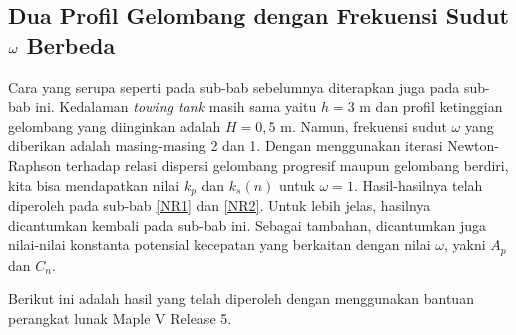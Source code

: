 \documentclass[12pt,a4paper]{report}
\begin{document}
\subsection{Dua Profil Gelombang dengan Frekuensi Sudut \textbf{$\protect \omega$} Berbeda}

Cara yang serupa seperti pada sub-bab sebelumnya diterapkan juga pada
sub-bab ini. Kedalaman \textit{towing tank} masih sama yaitu $h = 3$ m dan
profil ketinggian gelombang yang diinginkan adalah $H = 0,5$ m. Namun,
frekuensi sudut $\omega$ yang diberikan adalah masing-masing 2 dan 1. Dengan
menggunakan iterasi Newton-Raphson terhadap relasi dispersi gelombang
progresif maupun gelombang berdiri, kita bisa mendapatkan nilai $k_{p}$ dan $%
k_{s}(n)$ untuk $\omega = 1.$ Hasil-hasilnya telah diperoleh pada sub-bab
\ref{NR1} dan \ref{NR2}. Untuk lebih jelas, hasilnya dicantumkan kembali
pada sub-bab ini. Sebagai tambahan, dicantumkan juga nilai-nilai konstanta
potensial kecepatan yang berkaitan dengan nilai $\omega$, yakni $A_{p}$ dan $%
C_{n}$.

Berikut ini adalah hasil yang telah diperoleh dengan menggunakan bantuan
perangkat lunak Maple V Release 5.
\end{document}
